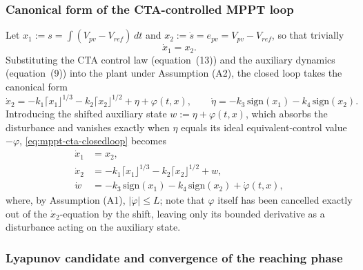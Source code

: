\documentclass[preprint,12pt]{elsarticle}
\begin{document}
\subsubsection{Canonical form of the CTA-controlled MPPT loop}
\label{subsubsec:cta-mppt-canonical}

Let $x_1 := s = \int (V_{pv}-V_{ref})\,dt$ and $x_2 := \dot{s} = e_{pv} = V_{pv}-V_{ref}$, so that trivially
\begin{equation}
    \dot{x}_1 = x_2 .
    \label{eq:mppt-x1-dot}
\end{equation}
Substituting the CTA control law (equation~(13)) and the auxiliary dynamics (equation~(9)) into the plant under Assumption (A2), the closed loop takes the canonical form
\begin{equation}
    \dot{x}_2 = -k_1 \lceil x_1 \rfloor^{1/3} - k_2 \lceil x_2 \rfloor^{1/2} + \eta + \varphi(t,x), \qquad
    \dot{\eta} = -k_3\,\mathrm{sign}(x_1) - k_4\,\mathrm{sign}(x_2).
    \label{eq:mppt-cta-closedloop}
\end{equation}
Introducing the shifted auxiliary state $w := \eta + \varphi(t,x)$, which absorbs the disturbance and vanishes exactly when $\eta$ equals its ideal equivalent-control value $-\varphi$, \eqref{eq:mppt-cta-closedloop} becomes
\begin{equation}
\begin{aligned}
    \dot{x}_1 &= x_2, \\
    \dot{x}_2 &= -k_1 \lceil x_1 \rfloor^{1/3} - k_2 \lceil x_2 \rfloor^{1/2} + w, \\
    \dot{w} &= -k_3\,\mathrm{sign}(x_1) - k_4\,\mathrm{sign}(x_2) + \dot{\varphi}(t,x),
\end{aligned}
    \label{eq:mppt-cta-shifted}
\end{equation}
where, by Assumption (A1), $|\dot\varphi| \leq L$; note that $\varphi$ itself has been cancelled exactly out of the $\dot{x}_2$-equation by the shift, leaving only its bounded derivative as a disturbance acting on the auxiliary state.

\subsubsection{Lyapunov candidate and convergence of the reaching phase}
\label{subsubsec:lyapunov-mppt}
\end{document}
